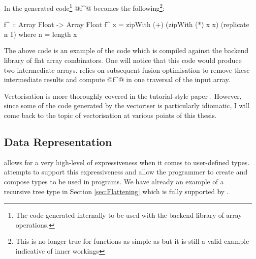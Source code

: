 \documentclass[preamble.tex]{subfiles}
\begin{document}
In the generated code\footnote{The code generated internally to be used with the backend library of array operations.} @f^@ becomes the following\footnote{This is no longer true for functions as simple as  \cite{vectavoid} but it is still a valid example indicative of \DPH inner workings }:

\begin{hscode}
f^ :: Array Float -> Array Float
f^ x = zipWith (+) (zipWith (*) x x)
                   (replicate n 1)
  where n = length x
\end{hscode}

The above code is an example of the code which is compiled against the backend library of flat array combinators. One will notice that this code would produce two intermediate arrays\iintermediate{}. \DPH relies on subsequent fusion optimisation to remove these intermediate results and compute @f^@ in one traversal of the input array.




Vectorisation is more thoroughly covered in the tutorial-style paper \cite{PLKC08}. However, since some of the code generated by the vectoriser is particularly idiomatic, I will come back to the topic of vectorisation at various points of this thesis.



\subsection{Data Representation}
\label{sub:DPH-Data-Representation}

\Haskell allows for a very high-level of expressiveness when it comes to user-defined types. \DPH attempts to support this expressiveness and allow the programmer to create and compose types to be used in \DPH programs. We have already an example of a recursive tree type in Section \ref{sec:Flattening} which is fully supported by \DPH.
\end{document}

